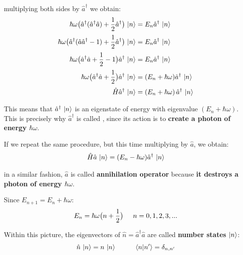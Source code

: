 multiplying both sides by $\hat{a}^\dagger$ we obtain:
\begin{equation}\label{eqn:11-eigenvalue-equation-number-operator-2}
\begin{split}
    \hbar \omega 
    \bigl(
        \hat{a}^\dagger(\hat{a}^\dagger\hat{a})+\frac{1}{2}\hat{a}^\dagger
    \bigr) \, \ket{n} 
    &= E_n \hat{a}^\dagger \, \ket{n} \\[0.5ex]
    \hbar \omega 
    \bigl(
        \hat{a}^\dagger(\hat{a}\hat{a}^\dagger-1)+\frac{1}{2}\hat{a}^\dagger
    \bigr)\, \ket{n} 
    &= E_n \hat{a}^\dagger \, \ket{n} \\[0.5ex]
    \hbar \omega 
    \bigl(
        \hat{a}^\dagger\hat{a}+\frac{1}{2}-1
    \bigr)\hat{a}^\dagger\, \ket{n} 
    &= E_n \hat{a}^\dagger \, \ket{n} \\[0.5ex]
    \hbar \omega 
    \bigl(
        \hat{a}^\dagger\hat{a}+\frac{1}{2}
    \bigr)\hat{a}^\dagger\, \ket{n} 
    &= (E_n+\hbar \omega ) \hat{a}^\dagger \, \ket{n}\\[0.5ex]
    \hat{H}\hat{a}^\dagger\, \ket{n} 
    &= (E_n+\hbar\omega)\, \hat{a}^\dagger \, \ket{n}
\end{split}
\end{equation}

This means that $\hat{a}^\dagger\, \ket{n}$ is an eigenstate of energy with eigenvalue $(E_n + \hbar \omega)$. This is precisely why $\hat{a}^\dagger$ is called , since its action is to \textbf{create a photon of energy $\hbar\omega$}.

If we repeat the same procedure, but this time multiplying by $\hat{a}$, we obtain:
\begin{equation}\label{eqn:11-eigenvalue-equation-number-operator-3}
\hat{H}\hat{a}\, \ket{n} = (E_n-\hbar \omega) \hat{a}^\dagger\, \ket{n}
\end{equation}

in a similar fashion, $\hat{a}$ is called \textbf{annihilation operator} because \textbf{it destroys a photon of energy $\hbar\omega$}.

Since $E_{n+1} = E_n+\hbar\omega$:
\begin{equation}\label{eqn:11-energy-eigenvalues-number-states}
E_n = \hbar \omega \bigl(n+\frac{1}{2}\bigr) \hspace{0.5cm} n = 0,1,2,3,...
\end{equation}

Within this picture, the eigenvectors of $\hat{n}=\hat{a}^\dagger\hat{a}$ are called \textbf{number states} $\ket{n}$:
\begin{equation}\label{eqn:11-number-states}
\hat{n} \, \ket{n} = n\, \ket{n} \hspace{1cm} \braket{n|n'} = \delta_{n,n'}
\end{equation}

